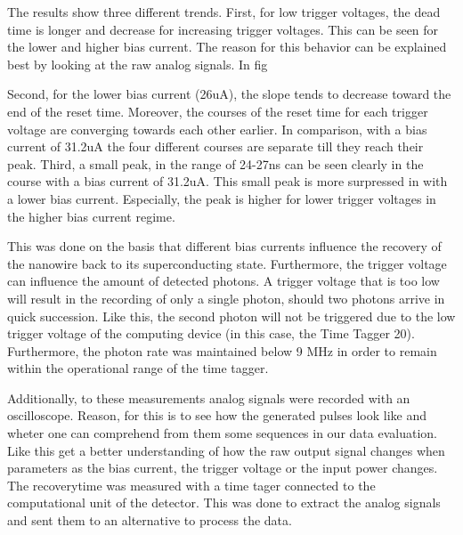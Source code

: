 The results show three different trends.
First, for low trigger voltages, the dead time is longer and decrease for increasing trigger voltages.
This can be seen for the lower and higher bias current.
The reason for this behavior can be explained best by looking at the raw analog signals.
In fig



Second, for the lower bias current (26uA), the slope tends to decrease toward the end of the reset time.
Moreover, the courses of the reset time for each trigger voltage are converging towards each other earlier.
In comparison, with a bias current of 31.2uA the four different courses are separate till they reach their peak.
Third, a small peak, in the range of 24-27ns can be seen clearly in the course with a bias current of 31.2uA.
This small peak is more surpressed in with a lower bias current.
Especially, the peak is higher for lower trigger voltages in the higher bias current regime.

This was done on the basis that different bias currents influence the recovery of the nanowire back to its
superconducting state.
Furthermore, the trigger voltage can influence the amount of detected photons.
A trigger voltage that is too low will result in the recording of only a single photon, should two photons arrive in
quick succession.
Like this, the second photon will not be triggered due to the low trigger voltage of the computing device
(in this case, the Time Tagger 20).
Furthermore, the photon rate was maintained below 9 MHz in order to remain within the operational
range of the time tagger.

Additionally, to these measurements analog signals were recorded with an oscilloscope.
Reason, for this is to see how the generated pulses look like and wheter one can comprehend from them some sequences in our
data evaluation.
Like this get a better understanding of how the raw output signal changes when parameters as the bias current, the trigger
voltage or the input power changes.\\


The recoverytime was measured with a time tager connected to the computational unit of the detector.
This was done to extract the analog signals and sent them to an alternative to process the data.



